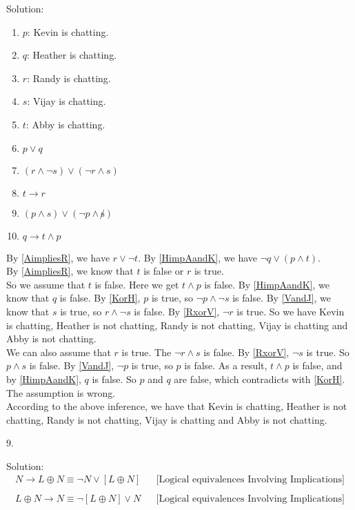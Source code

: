 \documentclass[12pt]{article}
\begin{document}
\indent Solution:\\
\begin{enumerate}
\item \label{Kchat} $p$: Kevin is chatting.
\item \label{Hchat} $q$: Heather is chatting.
\item \label{Rchat} $r$: Randy is chatting.
\item \label{Vchat} $s$: Vijay is chatting.
\item \label{Achat} $t$: Abby is chatting.
\item \label{KorH} $p \lor q$
\item \label{RxorV} $(r \land \lnot s) \lor (\lnot r \land s)$
\item \label{AimpliesR} $t \to r$
\item \label{VandJ} $(p \land s) \lor (\lnot p \land \not s)$
\item \label{HimpAandK} $q \to t \land p$
\end{enumerate}

By \ref{AimpliesR}, we have $r \lor \lnot t$. By \ref{HimpAandK}, we have $\lnot q \lor (p \land t)$.\\
\indent By \ref{AimpliesR}, we know that $t$ is false or $r$ is true. \\ 
\indent So we assume that $t$ is false. Here we get $t \land p$ is false. By \ref{HimpAandK}, we know that $q$ is false. By \ref{KorH}, $p$ is true, so $\lnot p \land \lnot s$ is false. By \ref{VandJ}, we know that $s$ is true, so $r \land \lnot s$ is false. By \ref{RxorV}, $\lnot r$ is true. So we have Kevin is chatting, Heather is not chatting, Randy is not chatting, Vijay is chatting and Abby is not chatting.\\ 
\indent We can also assume that $r$ is true. The $\lnot r \land s$ is false. By \ref{RxorV}, $\lnot s$ is true. So $p \land s$ is false. By \ref{VandJ}, $\lnot p$ is true, so $p$ is false. As a result, $t \land p$ is false, and by \ref{HimpAandK}, $q$ is false. So $p$ and $q$ are false, which contradicts with \ref{KorH}. The assumption is wrong.\\
\indent According to the above inference, we have that Kevin is chatting, Heather is not chatting, Randy is not chatting, Vijay is chatting and Abby is not chatting.
\newline

9. 

\indent Solution:\\
\begin{align*}
N \to L \oplus N \equiv \lnot N \lor [L \oplus N] && \text{[Logical equivalences Involving Implications]}\\ 
\end{align*}
\begin{align*}
L \oplus N \to N \equiv \lnot [L \oplus N] \lor N &&  \text{[Logical equivalences Involving Implications]} \\
\end{align*}
\end{document}
